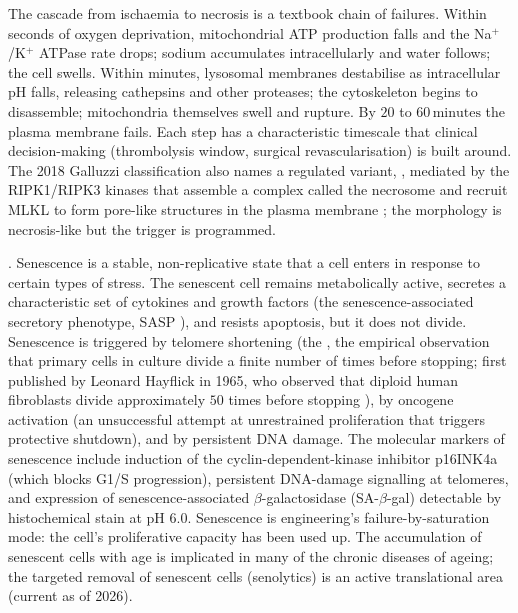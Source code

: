 The cascade from ischaemia to necrosis is a textbook chain of
failures. Within seconds of oxygen deprivation, mitochondrial ATP
production falls and the Na$^+$/K$^+$ ATPase rate drops; sodium
accumulates intracellularly and water follows; the cell swells. Within
minutes, lysosomal membranes destabilise as intracellular pH falls,
releasing cathepsins and other proteases; the cytoskeleton begins to
disassemble; mitochondria themselves swell and rupture. By $20$ to
$60\,\text{minutes}$ the plasma membrane fails. Each step has a
characteristic timescale that clinical decision-making (thrombolysis
window, surgical revascularisation) is built around. The 2018 Galluzzi
classification also names a regulated variant, ,
mediated by the RIPK1/RIPK3 kinases that assemble a complex called
the necrosome and recruit MLKL to form pore-like structures in the
plasma membrane \cite{paper:v6c01-galluzzi-2018}; the morphology is
necrosis-like but the trigger is programmed.

. Senescence is a stable, non-replicative state
that a cell enters in response to certain types of stress. The
senescent cell remains metabolically active, secretes a characteristic
set of cytokines and growth factors (the senescence-associated
secretory phenotype, SASP \cite{paper:v6c01-campisi-2013}), and
resists apoptosis, but it does not divide. Senescence is triggered by
telomere shortening (the , the empirical
observation that primary cells in culture divide a finite number of
times before stopping; first published by Leonard Hayflick in 1965,
who observed that diploid human fibroblasts divide approximately $50$
times before stopping
\cite{paper:v6c01-hayflick-1965,paper:v6c01-blasco-telomeres-2005}),
by oncogene activation (an unsuccessful attempt at unrestrained
proliferation that triggers protective shutdown), and by persistent
DNA damage. The molecular markers of senescence include induction of
the cyclin-dependent-kinase inhibitor p16INK4a (which blocks G1/S
progression), persistent DNA-damage signalling at telomeres, and
expression of senescence-associated $\beta$-galactosidase
(SA-$\beta$-gal) detectable by histochemical stain at pH $6.0$.
Senescence is engineering's failure-by-saturation mode: the cell's
proliferative capacity has been used up. The accumulation of
senescent cells with age is implicated in many of the chronic diseases
of ageing; the targeted removal of senescent cells (senolytics) is an
active translational area (current as of 2026).

